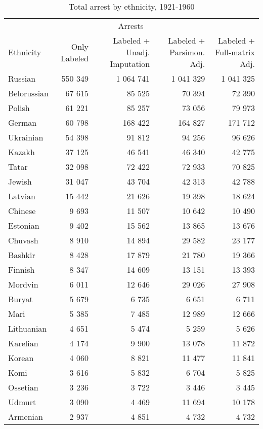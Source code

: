 \begin{table}[!h]

\caption{\label{tab:total_arrests_by_ethnicity}Total arrest by ethnicity, 1921-1960}
\centering
\fontsize{7}{9}\selectfont
\begin{tabular}{lrrrr}
\toprule
\multicolumn{1}{c}{ } & \multicolumn{3}{c}{Arrests} \\
\cmidrule(l{2pt}r{2pt}){2-4}
Ethnicity & Only Labeled & Labeled + Unadj. Imputation & Labeled + Parsimon. Adj. & Labeled + Full-matrix Adj.\\
\midrule
Russian & 550 349 & 1 064 741 & 1 041 329 & 1 041 325\\
Belorussian & 67 615 & 85 525 & 70 394 & 72 390\\
Polish & 61 221 & 85 257 & 73 056 & 79 973\\
German & 60 798 & 168 422 & 164 827 & 171 712\\
Ukrainian & 54 398 & 91 812 & 94 256 & 96 626\\
Kazakh & 37 125 & 46 541 & 46 340 & 42 775\\
Tatar & 32 098 & 72 422 & 72 933 & 70 825\\
Jewish & 31 047 & 43 704 & 42 313 & 42 788\\
Latvian & 15 442 & 21 626 & 19 398 & 18 624\\
Chinese & 9 693 & 11 507 & 10 642 & 10 490\\
Estonian & 9 402 & 15 562 & 13 865 & 13 676\\
Chuvash & 8 910 & 14 894 & 29 582 & 23 177\\
Bashkir & 8 428 & 17 879 & 21 780 & 19 366\\
Finnish & 8 347 & 14 609 & 13 151 & 13 393\\
Mordvin & 6 011 & 12 646 & 29 026 & 27 908\\
Buryat & 5 679 & 6 735 & 6 651 & 6 711\\
Mari & 5 385 & 7 485 & 12 989 & 12 666\\
Lithuanian & 4 651 & 5 474 & 5 259 & 5 626\\
Karelian & 4 174 & 9 900 & 13 078 & 11 872\\
Korean & 4 060 & 8 821 & 11 477 & 11 841\\
Komi & 3 616 & 5 832 & 6 704 & 5 825\\
Ossetian & 3 236 & 3 722 & 3 446 & 3 445\\
Udmurt & 3 090 & 4 469 & 11 694 & 10 178\\
Armenian & 2 937 & 4 851 & 4 732 & 4 732\\

\end{tabular}
\end{table}
